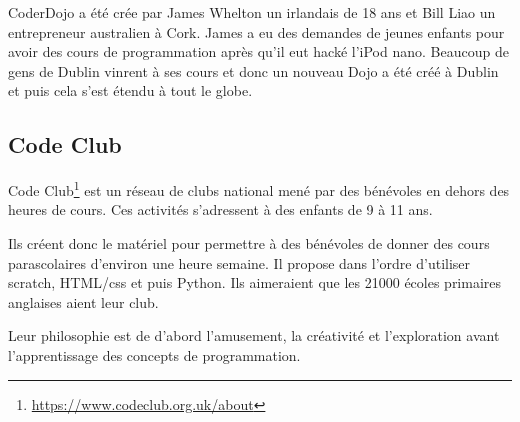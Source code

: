 CoderDojo a été crée par James Whelton un irlandais de 18 ans et Bill Liao un entrepreneur australien à Cork. James a eu des demandes de jeunes enfants pour avoir des cours de programmation après qu'il eut hacké l'iPod nano. Beaucoup de gens de Dublin vinrent à ses cours et donc un nouveau Dojo a été créé à Dublin et puis cela s'est étendu à tout le globe.

\subsection{Code Club}

Code Club\footnote{\url{https://www.codeclub.org.uk/about}} est un réseau de clubs national mené par des bénévoles en dehors des heures de cours. Ces activités s'adressent à des enfants de 9 à 11 ans.

Ils créent donc le matériel pour permettre à des bénévoles de donner des cours parascolaires d'environ une heure semaine. Il propose dans l'ordre d'utiliser scratch, HTML/css et puis Python. Ils aimeraient que les 21000 écoles primaires anglaises aient leur club.

Leur philosophie est de d'abord l'amusement, la créativité et l'exploration avant l'apprentissage des concepts de programmation.
